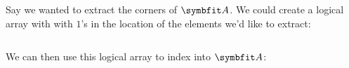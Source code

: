 \documentclass{article}
\begin{document}
Say we wanted to extract the corners of \(\mat{A}\).  We could create a
logical array with  with \(1\)'s in the location of the elements
we'd like to extract:

\inputminted{matlab}{03-indexing.d/corners.m}

\begin{minipage}{\textwidth}
	We can then use this logical array to index into \(\mat{A}\):

	\vspace{1em}

\end{minipage}
\end{document}
